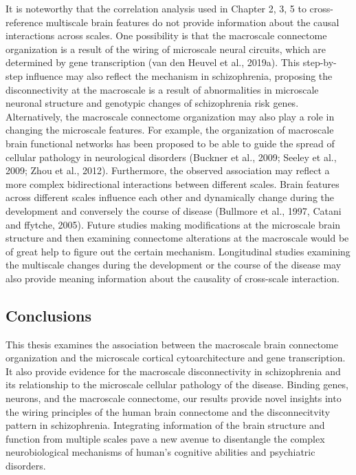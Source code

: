 \begin{refsection}
It is noteworthy that the correlation analysis used in Chapter 2, 3, 5 to cross-reference multiscale brain features do not provide information about the causal interactions across scales. One possibility is that the macroscale connectome organization is a result of the wiring of microscale neural circuits, which are determined by gene transcription (van den Heuvel et al., 2019a). This step-by-step influence may also reflect the mechanism in schizophrenia, proposing the disconnectivity at the macroscale is a result of abnormalities in microscale neuronal structure and genotypic changes of schizophrenia risk genes. Alternatively, the macroscale connectome organization may also play a role in changing the microscale features. For example, the organization of macroscale brain functional networks has been proposed to be able to guide the spread of cellular pathology in neurological disorders (Buckner et al., 2009; Seeley et al., 2009; Zhou et al., 2012). Furthermore, the observed association may reflect a more complex bidirectional interactions between different scales. Brain features across different scales influence each other and dynamically change during the development and conversely the course of disease (Bullmore et al., 1997, Catani and ffytche, 2005). Future studies making modifications at the microscale brain structure and then examining connectome alterations at the macroscale would be of great help to figure out the certain mechanism. Longitudinal studies examining the multiscale changes during the development or the course of the disease may also provide meaning information about the causality of cross-scale interaction.

\subsection*{Conclusions}
This thesis examines the association between the macroscale brain connectome organization and the microscale cortical cytoarchitecture and gene transcription. It also provide evidence for the macroscale disconnectivity in schizophrenia and its relationship to the microscale cellular pathology of the disease. Binding genes, neurons, and the macroscale connectome, our results provide novel insights into the wiring principles of the human brain connectome and the disconnecitvity pattern in schizophrenia. Integrating information of the brain structure and function from multiple scales pave a new avenue to disentangle the complex neurobiological mechanisms of human’s cognitive abilities and psychiatric disorders.



\end{refsection}
